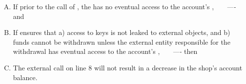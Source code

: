 \vspace{.05cm}
\begin{enumerate}[(A)]
\item   If prior to the call of  , the   has no eventual access to the account's \password, \ \ \ \emph{----} and
\item  If \Mshop ensures that a) access to keys is not leaked to external objects, 
and b) funds cannot be withdrawn unless the external entity responsible for the withdrawal has eventual access to the account's \password, \ \ \ \emph{----} then
\item  The external  call on line 8 will not result  in a decrease in the shop's account balance.
\end{enumerate}

